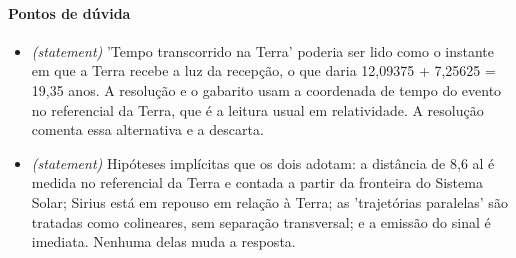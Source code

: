 \documentclass{article}%
\begin{document}
\paragraph{Pontos de dúvida}%
\begin{itemize}%
\item%
\textit{(statement)} 'Tempo transcorrido na Terra' poderia ser lido como o instante em que a Terra recebe a luz da recepção, o que daria 12,09375 + 7,25625 = 19,35 anos. A resolução e o gabarito usam a coordenada de tempo do evento no referencial da Terra, que é a leitura usual em relatividade. A resolução comenta essa alternativa e a descarta.%
\item%
\textit{(statement)} Hipóteses implícitas que os dois adotam: a distância de 8,6 al é medida no referencial da Terra e contada a partir da fronteira do Sistema Solar; Sirius está em repouso em relação à Terra; as 'trajetórias paralelas' são tratadas como colineares, sem separação transversal; e a emissão do sinal é imediata. Nenhuma delas muda a resposta.%
\end{itemize}%
\end{document}
